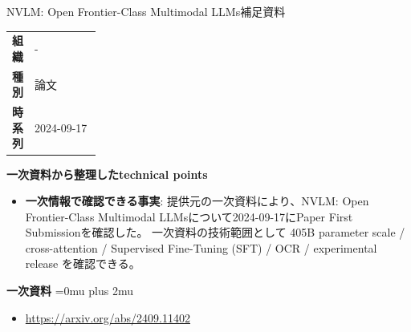 \begin{technicalnote}{NVLM: Open Frontier-Class Multimodal LLMs}{補足資料}
\begingroup
\begin{tabularx}{\linewidth}{@{}>{\bfseries}p{0.22\linewidth}X@{}}
組織 & - \\
種別 & 論文 \\
時系列 & 2024-09-17 \\
\end{tabularx}
\smallskip
{\bfseries 一次資料から整理したtechnical points}
\begin{itemize}[leftmargin=1.5em,itemsep=0.35em]
\item \textbf{一次情報で確認できる事実}: 提供元の一次資料により、NVLM: Open Frontier-Class Multimodal LLMsについて2024-09-17にPaper First Submissionを確認した。 一次資料の技術範囲として 405B parameter scale / cross-attention / Supervised Fine-Tuning (SFT) / OCR / experimental release を確認できる。
\end{itemize}
\begin{minipage}{\linewidth}
\begin{samepage}
{\bfseries 一次資料}
\begingroup\sloppy
\Urlmuskip=0mu plus 2mu\relax
\begin{itemize}[leftmargin=1.5em,itemsep=0.25em]
\item {\scriptsize\url{https://arxiv.org/abs/2409.11402}}
\end{itemize}
\endgroup
\end{samepage}
\end{minipage}
\endgroup
\end{technicalnote}
\medskip

